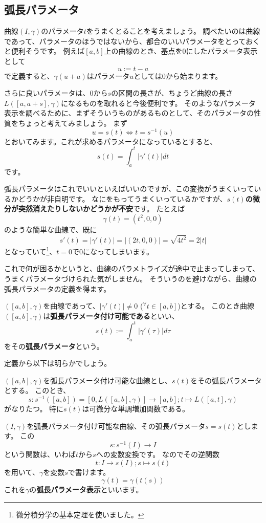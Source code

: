 \subsection{弧長パラメータ}

曲線$(I,\gamma)$のパラメータ$t$をうまくとることを考えましょう。
調べたいのは曲線であって、パラメータのほうではないから、都合のいいパラメータをとっておくと便利そうです。
例えば$[a,b]$上の曲線のとき、基点を0にしたパラメータ表示として
\[
  u:=t-a
\]
で定義すると、$\gamma(u+a)$はパラメータ$u$としては0から始まります。

さらに良いパラメータは、$0$から$s$の区間の長さが、ちょうど曲線の長さ$L([a,a+s],\gamma)$になるものを取れると今後便利です。
そのようなパラメータ表示を調べるために、まずそういうものがあるものとして、そのパラメータの性質をちょっと考えてみましょう。
まず
\[
  u=s(t)\iff t=s^{-1}(u)
\]
とおいてみます。これが求めるパラメータになっているとすると、
\[
  s(t)=\int_a^t|\gamma'(t)|dt
\]
です。

弧長パラメータはこれでいいといえばいいのですが、この変換がうまくいっているかどうかが非自明です。
なにをもってうまくいっているかですが、\textbf{$s(t)$の微分が突然消えたりしないかどうかが不安}です。
たとえば
\[
  \gamma(t)=(t^2,0,0)
\]
のような簡単な曲線で、既に
\[
  s'(t)=|\gamma'(t)|=|(2t,0,0)|=\sqrt{4t^2}=2|t|
\]
となっていて\footnote{
  微分積分学の基本定理を使いました。
}、$t=0$で0になってしまいます。

これで何が困るかというと、曲線のパラメトライズが途中で止まってしまって、うまくパラメータづけられた気がしません。
そういうのを避けながら、曲線の弧長パラメータの定義を得ます。
\begin{definition}
  $([a,b],\gamma)$を曲線であって、$|\gamma'(t)|\neq0$ (${}^\forall t\in [a,b]$)とする。
  このとき曲線$([a,b],\gamma)$は\textbf{弧長パラメータ付け可能である}といい、
  \[
    s(t):=\int_a^t|\gamma'(\tau)|d\tau
  \]
  をその\textbf{弧長パラメータ}という。
\end{definition}
定義から以下は明らかでしょう。
\begin{theorem}
  $([a,b],\gamma)$を弧長パラメータ付け可能な曲線とし、$s(t)$をその弧長パラメータとする。
  このとき、
  \[
    s:s^{-1}([a,b])=[0,L([a,b],\gamma)]\to[a,b];t\mapsto L([a,t],\gamma)
  \]
  がなりたつ。
  特に$s(t)$は可微分な単調増加関数である。
\end{theorem}

$(I,\gamma)$を弧長パラメータ付け可能な曲線、その弧長パラメータ$s=s(t)$とします。
この
\[
  s:s^{-1}(I)\to I
\]
という関数は、いわば$t$から$s$への変数変換です。
なのでその逆関数
\[
  t:I\to s(I);s\mapsto s(t)
\]
を用いて、$\gamma$を変数$s$で書けます。
\[
  \gamma(t)=\gamma(t(s))
\]
これを$\gamma$の\textbf{弧長パラメータ表示}といいます。

